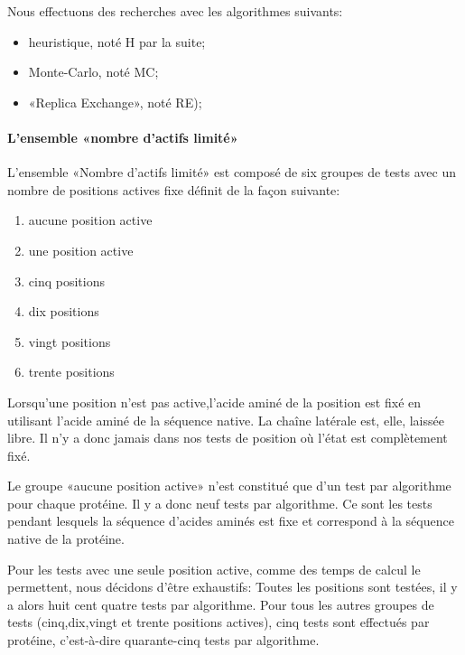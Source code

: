 Nous effectuons des recherches avec les algorithmes suivants:

\begin{itemize}
\item heuristique, noté H par la suite;
\item Monte-Carlo, noté MC;
\item «Replica Exchange», noté RE);
\end{itemize}


\paragraph{L'ensemble «nombre d'actifs limité»}

L'ensemble «Nombre d'actifs limité» est composé de six groupes de tests avec un nombre de positions actives fixe définit de la façon suivante:  


\begin{enumerate}
\item aucune position active
\item une position active 
\item cinq positions 
\item dix  positions 
\item vingt positions 
\item trente positions 
\end{enumerate}

Lorsqu'une position n'est pas active,l'acide aminé de la position est fixé en utilisant l'acide aminé de la séquence native. La chaîne latérale est, elle, laissée libre. Il n'y a donc jamais dans nos tests de position où l'état est complètement fixé.

Le groupe «aucune position active» n'est constitué que d'un test par algorithme pour chaque protéine. Il y a donc neuf tests par algorithme.
Ce sont les tests pendant lesquels la séquence d'acides aminés est fixe et correspond à la séquence native de la protéine.

Pour les tests avec une seule position active, comme des temps de calcul le permettent, nous décidons d'être exhaustifs:
Toutes les positions sont testées, il y a alors huit cent quatre tests par algorithme.
Pour tous les autres groupes de tests (cinq,dix,vingt et trente positions actives), cinq tests sont effectués par protéine, c'est-à-dire quarante-cinq tests par algorithme.

